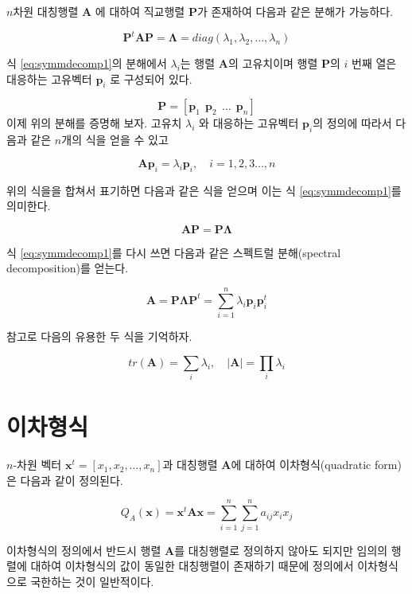 \documentclass[
  10pt,
]{book}
\theoremstyle{definition}
\theoremstyle{definition}
\theoremstyle{definition}
\theoremstyle{definition}
\theoremstyle{remark}
\begin{document}
\(n\)차원 대칭행렬 \(\bm A\) 에 대하여 직교행렬 \(\bm P\)가 존재하여 다음과 같은 분해가 가능하다.

\begin{equation}
 \bm P^t \bm A \bm P = \bm \Lambda = diag(\lambda_1, \lambda_2, \dots, \lambda_n) 
 \label{eq:symmdecomp1}
\end{equation}

식 \eqref{eq:symmdecomp1}의 분해에서 \(\lambda_i\)는 행렬 \(\bm A\)의 고유치이며 행렬 \(\bm P\)의 \(i\) 번째 열은 대응하는 고유벡터 \(\bm p_i\) 로 구성되어 있다.

\[ \bm P = [ \bm p_1~~ \bm p_2 ~~ \dots ~~ \bm p_n ] \]
이제 위의 분해를 증명해 보자. 고유치 \(\lambda_i\) 와 대응하는 고유벡터 \(\bm p_i\)의 정의에 따라서 다음과 같은 \(n\)개의 식을 얻을 수 있고

\[ \bm A \bm p_i = \lambda_i \bm p_i , \quad i=1,2,3\dots, n \]

위의 식을을 합쳐서 표기하면 다음과 같은 식을 얻으며 이는 식 \eqref{eq:symmdecomp1}를 의미한다.

\[ \bm A \bm P = \bm P \bm \Lambda \]

식 \eqref{eq:symmdecomp1}를 다시 쓰면 다음과 같은 스펙트럴 분해(spectral decomposition)를 얻는다.

\begin{equation}
 \bm A  = \bm P \bm \Lambda \bm P^t  = \sum_{i=1}^n \lambda_i \bm p_i \bm {p}_i^t 
 \label{eq:spectral}
\end{equation}

참고로 다음의 유용한 두 식을 기억하자.

\[ tr(\bm A) = \sum_i \lambda_i ,\quad |\bm A| = \prod_i \lambda_i \]

\hypertarget{uxc774uxcc28uxd615uxc2dd}{%
\section{이차형식}\label{uxc774uxcc28uxd615uxc2dd}}

\(n\)-차원 벡터 \(\bm x^t=[x_1,x_2,\dots,x_n]\)과 대칭행렬 \(\bm A\)에 대하여 이차형식(quadratic form)은 다음과 같이 정의된다.

\begin{equation}
Q_A(\bm x) = \bm x^t \bm A \bm x =\sum_{i=1}^n \sum_{j=1}^n a_{ij} x_i x_j 
\label{eq:quadratic}
\end{equation}

이차형식의 정의에서 반드시 행렬 \(\bm A\)를 대칭행렬로 정의하지 않아도 되지만 임의의 행렬에 대하여 이차형식의 값이 동일한 대칭행렬이 존재하기 때문에 정의에서 이차형식으로 국한하는 것이 일반적이다.
\end{document}
